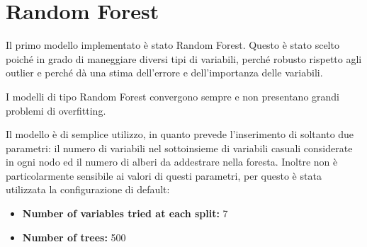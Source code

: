 \section{Random Forest}
Il primo modello implementato è stato Random Forest. Questo è stato scelto 
poiché in grado di maneggiare diversi tipi di variabili, perché robusto 
rispetto agli outlier e perché dà una stima dell'errore e dell'importanza delle 
variabili. 

I modelli di tipo Random Forest convergono sempre e non presentano grandi  
problemi di overfitting.

Il modello è di semplice utilizzo, in quanto prevede l’inserimento di soltanto 
due parametri: il numero di variabili nel sottoinsieme di variabili casuali 
considerate in ogni nodo ed il numero di alberi da addestrare nella foresta. 
Inoltre non è particolarmente sensibile ai valori di questi parametri, per 
questo è stata utilizzata la configurazione di default:
\begin{itemize}
	\item \textbf{Number of variables tried at each split:} 7
	\item \textbf{Number of trees:} 500
\end{itemize}
